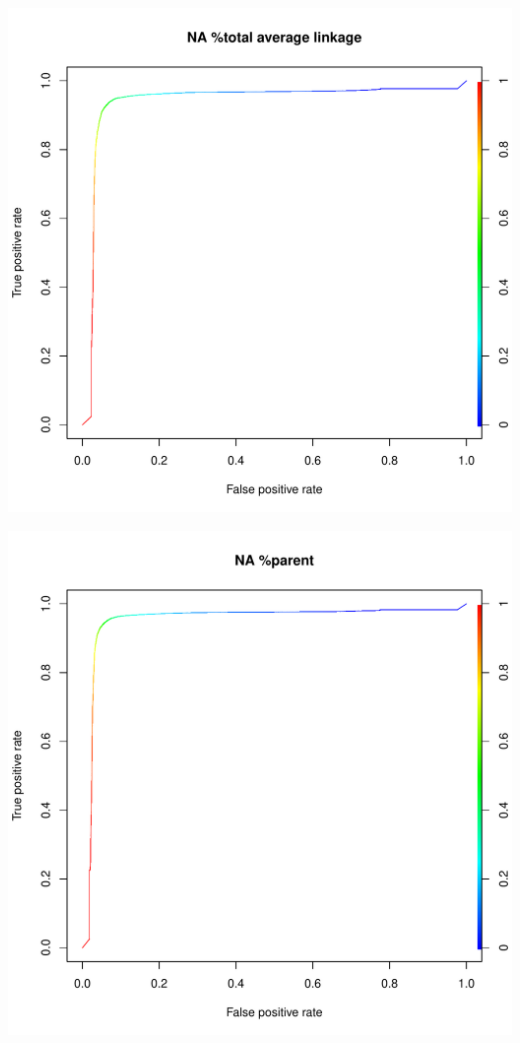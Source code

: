 \documentclass[11pt,a4paper,twoside]{report}\usepackage[]{graphicx}\usepackage[]{color}
\makeatletter
\def\maxwidth{ %
  \ifdim\Gin@nat@width>\linewidth
    \linewidth
  \else
    \Gin@nat@width
  \fi
}
\newenvironment{knitrout}{}{} %
\makeatother
\begin{document}
\begin{knitrout}
\includegraphics[width=\maxwidth]{figure/fig_code-17} 

\includegraphics[width=\maxwidth]{figure/fig_code-18} 


\end{knitrout}
\end{document}
